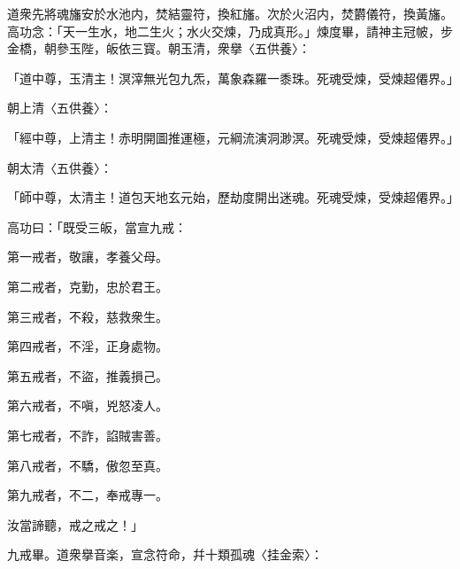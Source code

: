 道衆先將魂旛安於水池内，焚結靈符，換紅旛。次於火沼内，焚欝儀符，換黃旛。高功念：「天一生水，地二生火；水火交煉，乃成真形。」煉度畢，請神主冠帔，步金橋，朝參玉陛，皈依三寳。朝玉清，衆擧〈五供養〉：

\begin{myquote}
「道中尊，玉清主！溟滓無光包九炁，萬象森羅一黍珠。死魂受煉，受煉超僊界。」
\end{myquote}

朝上清〈五供養〉：

\begin{myquote}
「經中尊，上清主！赤明開圖推運極，元綱流演洞渺溟。死魂受煉，受煉超僊界。」
\end{myquote}

朝太清〈五供養〉：

\begin{myquote}
「師中尊，太清主！道包天地玄元始，歷劫度開出迷魂。死魂受煉，受煉超僊界。」
\end{myquote}

高功曰：「既受三皈，當宣九戒：

\begin{myquote}
第一戒者，敬讓，孝養父母。

第二戒者，克勤，忠於君王。

第三戒者，不殺，慈救衆生。

第四戒者，不淫，正身處物。

第五戒者，不盜，推義損己。

第六戒者，不嗔，兇怒凌人。

第七戒者，不詐，諂賊害善。

第八戒者，不驕，傲忽至真。

第九戒者，不二，奉戒專一。

汝當諦聽，戒之戒之！」
\end{myquote}

九戒畢。道衆擧音楽，宣念符命，幷十類孤魂〈挂金索〉：

